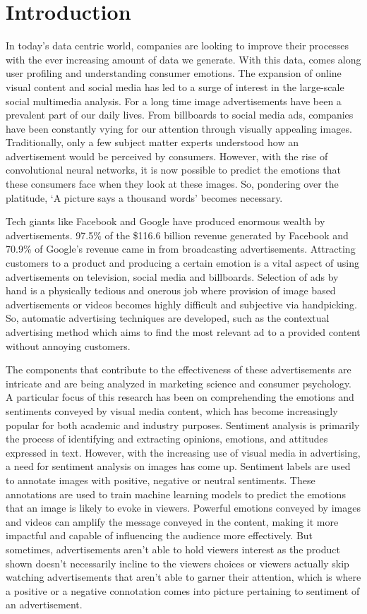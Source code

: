 \documentclass[conference]{IEEEtran}
\begin{document}
\section{Introduction}
In today's data centric world, companies are looking to improve their processes 
 with the ever increasing amount of data we generate. With this data, comes 
 along user profiling and understanding consumer emotions. The 
 expansion of online visual content and social media has led to a surge of 
 interest in the large-scale social multimedia analysis. For a long time image advertisements 
have been a prevalent part of our daily lives. From billboards to social 
media ads, companies have been constantly vying for our attention through visually 
appealing images. Traditionally, only a few subject matter experts understood how 
an advertisement would be perceived by consumers. However, with the rise of 
convolutional neural networks, it is now possible to predict the emotions that 
these consumers face when they look at these images. So, 
pondering over the platitude, `A picture says a thousand words' becomes necessary.

Tech giants like Facebook and Google have produced enormous wealth by 
advertisements. 97.5\% of the \$116.6 billion revenue generated by 
Facebook\cite{b1} and 70.9\% of Google's revenue\cite{b2} came in from 
broadcasting advertisements. Attracting customers to a product and producing a 
certain emotion is a vital aspect of using advertisements on television, social media
 and billboards. Selection of ads by hand is a physically tedious and onerous job 
 where provision of image based advertisements or videos becomes highly difficult 
 and subjective via handpicking. 
So, automatic advertising techniques are developed, such as the contextual 
advertising method which aims to find the most relevant ad to a provided 
content without annoying customers.

The components that contribute to the effectiveness of these advertisements are 
intricate and are being analyzed in marketing science and consumer psychology. 
A particular focus of this research has been on comprehending the emotions and 
sentiments conveyed by visual media content, which has become increasingly 
popular for both academic and industry purposes. Sentiment analysis is primarily the 
process of identifying and extracting opinions, emotions, and attitudes expressed 
in text. However, with the increasing use of visual media in advertising, a need 
for sentiment analysis on images has come up. Sentiment labels are used to 
annotate images with positive, negative or neutral sentiments. These annotations 
are used to train machine learning models to predict the emotions that an image is 
likely to evoke in viewers.
Powerful emotions conveyed by images and videos can amplify the message conveyed 
in the content, making it more impactful and capable of influencing the audience 
more effectively. But sometimes, advertisements aren't able to hold viewers 
interest as the product shown doesn't necessarily incline to the viewers choices 
or viewers actually skip watching advertisements that aren't able to garner 
their attention, which is where a positive or a negative connotation comes 
into picture pertaining to sentiment of an advertisement.
\end{document}

